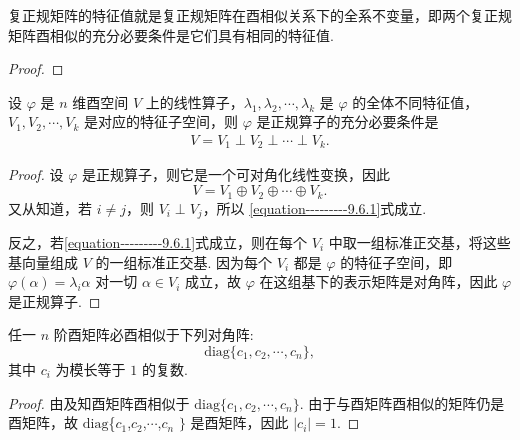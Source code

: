 \documentclass[../../main.tex]{subfiles}
\begin{document}
\begin{theorem}\label{theorem:复正规矩阵的特征值就是复正规矩阵在酉相似关系下的全系不变量}
复正规矩阵的特征值就是复正规矩阵在酉相似关系下的全系不变量，即两个复正规矩阵酉相似的充分必要条件是它们具有相同的特征值.
\end{theorem}
\begin{proof}

\end{proof}

\begin{proposition}
设 $\varphi$ 是 $n$ 维酉空间 $V$ 上的线性算子，$\lambda_1,\lambda_2,\cdots,\lambda_k$ 是 $\varphi$ 的全体不同特征值，$V_1,V_2,\cdots,V_k$ 是对应的特征子空间，则 $\varphi$ 是正规算子的充分必要条件是
\begin{align}\label{equation---------9.6.1}
V = V_1 \perp V_2 \perp \cdots \perp V_k. 
\end{align}
\end{proposition}
\begin{proof}
设 $\varphi$ 是正规算子，则它是一个可对角化线性变换，因此
\[
V = V_1 \oplus V_2 \oplus \cdots \oplus V_k.
\]
又从知道，若 $i \neq j$，则 $V_i \perp V_j$，所以 \eqref{equation---------9.6.1}式成立.

反之，若\eqref{equation---------9.6.1}式成立，则在每个 $V_i$ 中取一组标准正交基，将这些基向量组成 $V$ 的一组标准正交基. 因为每个 $V_i$ 都是 $\varphi$ 的特征子空间，即 $\varphi(\alpha) = \lambda_i\alpha$ 对一切 $\alpha \in V_i$ 成立，故 $\varphi$ 在这组基下的表示矩阵是对角阵，因此 $\varphi$ 是正规算子. 
\end{proof}

\begin{theorem}
任一 $n$ 阶酉矩阵必酉相似于下列对角阵:
\[
\mathrm{diag}\{c_1,c_2,\cdots,c_n\},
\]
其中 $c_i$ 为模长等于 $1$ 的复数.
\end{theorem}
\begin{proof}
由及知酉矩阵酉相似于 $\mathrm{diag}\{c_1,c_2,\cdots,c_n\}$. 由于与酉矩阵酉相似的矩阵仍是酉矩阵，故 $\mathrm{diag}$\{$c_1$,$c_2$,$\cdots$,$c_n$ $\}$ 是酉矩阵，因此 $|c_i| = 1$.
\end{proof}
\end{document}
